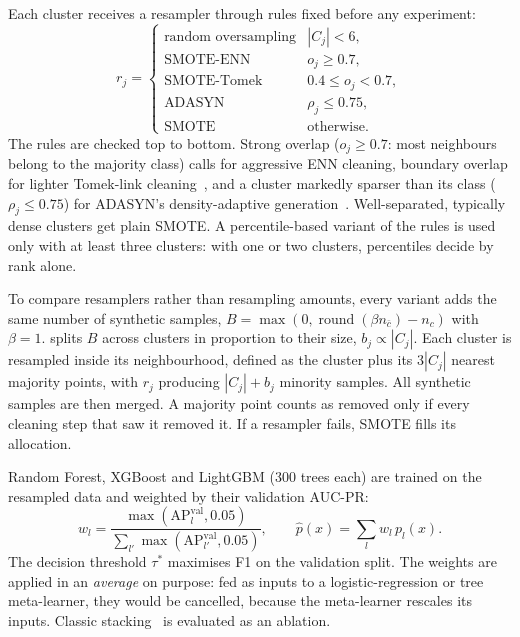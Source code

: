 Each cluster receives a resampler through rules fixed before any experiment:
\begin{equation}
  r_j=\begin{cases}
    \text{random oversampling} & |C_j| < 6,\\
    \text{SMOTE-ENN} & o_j \ge 0.7,\\
    \text{SMOTE-Tomek} & 0.4 \le o_j < 0.7,\\
    \text{ADASYN} & \rho_j \le 0.75,\\
    \text{SMOTE} & \text{otherwise.}
  \end{cases}
  \label{eq:rules}
\end{equation}
The rules are checked top to bottom. Strong overlap ($o_j\ge0.7$: most neighbours belong to the majority class) calls
for aggressive ENN cleaning, boundary overlap for lighter Tomek-link cleaning~\cite{batista2004study}, and a cluster
markedly sparser than its class ($\rho_j\le0.75$) for ADASYN's density-adaptive generation~\cite{he2008adasyn}.
Well-separated, typically dense clusters get plain SMOTE. A percentile-based variant of the rules is used only with at least three
clusters: with one or two clusters, percentiles decide by rank alone.

To compare resamplers rather than resampling amounts, every variant adds the same number of synthetic samples,
$B=\max(0,\operatorname{round}(\beta n_{\bar c})-n_c)$ with $\beta=1$. \ars{} splits $B$ across clusters in proportion
to their size, $b_j\propto|C_j|$. Each cluster is resampled inside its neighbourhood, defined as the cluster plus its
$3|C_j|$ nearest majority points, with $r_j$ producing $|C_j|+b_j$ minority samples. All synthetic samples are then
merged. A majority point counts as removed only if every cleaning step that saw it removed it. If a resampler fails,
SMOTE fills its allocation.

Random Forest, XGBoost and LightGBM (300 trees each) are trained on the resampled data and weighted by their
validation AUC-PR:
\begin{equation}
  w_l=\frac{\max(\mathrm{AP}^{\mathrm{val}}_l,0.05)}{\sum_{l'}\max(\mathrm{AP}^{\mathrm{val}}_{l'},0.05)},\qquad
  \hat p(x)=\sum_l w_l\,p_l(x).
  \label{eq:weights}
\end{equation}
The decision threshold $\tau^\ast$ maximises F1 on the validation split. The weights are applied in an \emph{average}
on purpose: fed as inputs to a logistic-regression or tree meta-learner, they would be cancelled, because the
meta-learner rescales its inputs. Classic stacking~\cite{wolpert1992stacked} is evaluated as an ablation.

